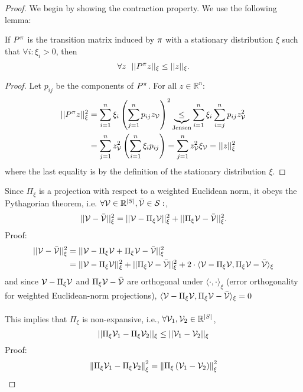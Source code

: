 \begin{proof}
We begin by showing the contraction property. We use the following lemma:
\begin{lemma}\label{lem:P_non_expansion} 
If $P^\pi$ is the transition matrix induced by $\pi$
with a stationary distribution $\xi$ such that
$\forall i: \xi_{i}>0$, then
$$\forall z \ \ ||P^\pi z||_\xi \le ||z||_\xi.$$
\end{lemma}
\begin{proof}
Let $p_{ij}$ be the components of $P^\pi$. For all $z \in \mathbb{R}^n$:
\begin{align*}
||P^{\pi}z||_{\xi}^{2} & =\sum_{i=1}^{n}\xi_{i}\left(\sum_{j=1}^{n}p_{ij}z_{\mathcal{V}}\right)^{2}\underbrace{\leq}_{\textrm{Jensen}}\sum_{i=1}^{n}\xi_{i}\sum_{i=j}^{n}p_{ij}z_{\mathcal{V}}^{2}\\
 & =\sum_{j=1}^{n}z_{\mathcal{V}}^{2}\left(\sum_{i=1}^{n}\xi_{i}p_{ij}\right)=\sum_{j=1}^{n}z_{\mathcal{V}}^{2}\xi_{\mathcal{V}}=||z||_{\xi}^{2}
\end{align*}
 where the last equality is by the definition of the stationary
distribution $\xi$.
\end{proof}
Since $\Pi_\xi$ is a projection with respect to a weighted Euclidean norm, it obeys the Pythagorian theorem, i.e. $\forall \mathcal{V}\in \mathbb{R}^{|S|}, \bar{\mathcal{V}}\in \mathcal{S}:$,
$$||\mathcal{V}-\bar{\mathcal{V}}||_\xi^2 = ||\mathcal{V}-\Pi_\xi \mathcal{V}||_\xi^2 + ||\Pi_\xi \mathcal{V} - \bar{\mathcal{V}}||_\xi^2.$$
Proof:
\begin{align*}
||\mathcal{V}-\bar{\mathcal{V}}||_{\xi}^{2} & =||\mathcal{V}-\Pi_{\xi}\mathcal{V}+\Pi_{\xi}\mathcal{V}-\bar{\mathcal{V}}||_{\xi}^{2}\\
 & =||\mathcal{V}-\Pi_{\xi}\mathcal{V}||_{\xi}^{2}+||\Pi_{\xi}\mathcal{V}-\bar{\mathcal{V}}||_{\xi}^{2}+2\cdot\langle\mathcal{V}-\Pi_{\xi}\mathcal{V},\Pi_{\xi}\mathcal{V}-\bar{\mathcal{V}}\rangle_{\xi}
\end{align*}
and since $\mathcal{V}-\Pi_\xi \mathcal{V}$ and $\Pi_\xi \mathcal{V}-\bar{\mathcal{V}}$ are orthogonal under $\langle\cdot,\cdot\rangle_\xi$ (error orthogonality for weighted Euclidean-norm projections),
$\langle\mathcal{V}-\Pi_{\xi}\mathcal{V},\Pi_{\xi}\mathcal{V}-\bar{\mathcal{V}}\rangle_{\xi}=0$
\\
\\
This implies that $\Pi_\xi$ is non-expansive, i.e., $\forall {\mathcal{V}}_1,{\mathcal{V}}_2\in \mathbb{R}^{|S|}$,
$$||\Pi_\xi {\mathcal{V}}_1 - \Pi_\xi {\mathcal{V}}_2||_\xi \le ||{\mathcal{V}}_1-{\mathcal{V}}_2||_\xi$$
Proof:
\begin{align*}
\left\Vert \Pi_{\xi}\Value_{1}-\Pi_{\xi}\Value_{2}\right\Vert _{\xi}^{2} & =\left\Vert \Pi_{\xi}\left(\Value_{1}-\Value_{2}\right)\right\Vert _{\xi}^{2}\\

\end{align*}
\end{proof}
